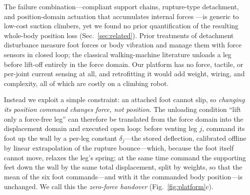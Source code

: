 \documentclass[journal]{IEEEtran}
\begin{document}
The failure combination---compliant support chains, rupture-type
detachment, and position-domain actuation that accumulates internal
forces \cite{gorner2009dlr}---is generic to low-cost suction climbers,
yet we found no prior quantification of the resulting whole-body position
loss (Sec.~\ref{sec:related}). Prior treatments of detachment disturbance
measure foot forces or body vibration and manage them with force sensors
in closed loop; the classical walking-machine literature unloads a leg
before lift-off entirely in the force domain. Our platform has no force,
tactile, or per-joint current sensing at all, and retrofitting it would
add weight, wiring, and complexity, all of which are costly on a
climbing robot.

Instead we exploit a simple constraint: an
attached foot cannot slip, so \emph{changing its position command changes
force, not position}. The unloading condition ``lift only a force-free
leg'' can therefore be translated from the force domain into the
displacement domain and executed open loop: before venting leg $j$,
command its foot up the wall by a per-leg constant $\delta_j$---the
stored deflection, calibrated offline by linear extrapolation of the
rupture bounce---which, because the foot itself cannot move, relaxes
the leg's spring; at the same time command the supporting feet down the
wall by the same total displacement, split by weights, so that the mean
of the six foot commands---and with it the commanded body
position---is unchanged. We call this the \emph{zero-force handover}
(Fig.~\ref{fig:platform}c).
\end{document}
